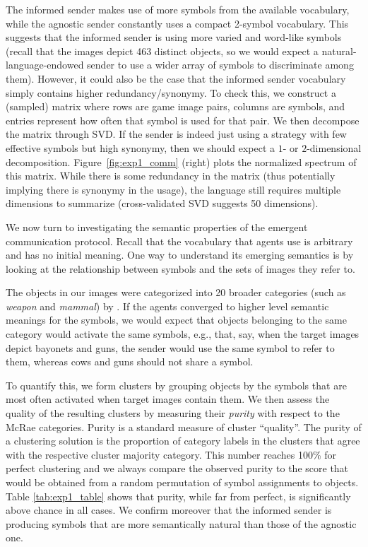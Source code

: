 The informed sender makes use of more symbols from the available vocabulary, while the agnostic
sender constantly uses a compact 2-symbol vocabulary. This suggests
that the informed sender is using more varied and word-like symbols
(recall that the images depict 463 distinct objects, so we would
expect a natural-language-endowed sender to use a wider array of
symbols to discriminate among them). However, it could also be the
case that the informed sender vocabulary simply contains higher
redundancy/synonymy. To check this, we construct a (sampled) matrix where rows are game image pairs, columns are symbols, and entries represent how often that symbol is used for that pair. We then decompose the matrix through SVD. If the sender is indeed just using a strategy with few effective symbols but high synonymy, then we should expect a $1$- or $2$-dimensional decomposition. Figure~\ref{fig:exp1_comm} (right) plots the normalized spectrum of this matrix. While there is some redundancy in the matrix (thus potentially implying there is synonymy in the usage), the language still requires multiple dimensions to summarize (cross-validated SVD suggests 50 dimensions).

We now turn to investigating the semantic properties of the emergent
communication protocol. Recall that the vocabulary that agents use is
arbitrary and has no initial meaning. One way to understand its
emerging semantics is by looking at the relationship between symbols
and the sets of images they refer to. 

The objects in our images were categorized into 20 broader
categories (such as \emph{weapon} and \emph{mammal}) by
\cite{McRae:etal:2005}. If the agents converged to higher level semantic meanings
for the symbols, we would expect that objects belonging to the same
category would activate the same symbols, e.g., that, say, when the
target images depict bayonets and guns, the sender would use the same
symbol to refer to them, whereas cows and guns should not share a
symbol. 

To quantify this, we form clusters by grouping objects by the symbols that
are most often activated when target images contain them. We then
assess the quality of the resulting clusters 
by measuring their \emph{purity} with respect to the McRae
categories. Purity \citep{Zhao:Karypis:2001} is a standard measure of
cluster ``quality''. The purity of a clustering solution is the proportion of category labels in the clusters that agree with the respective cluster majority category. This number reaches 100\% for perfect clustering and we always compare the observed purity to the score that would be obtained from a random permutation of symbol assignments to objects. Table \ref{tab:exp1_table} shows that purity, while far from perfect,
is significantly above chance in all cases. We confirm moreover that
the informed sender is producing symbols that are more semantically
natural than those of the agnostic one. 

